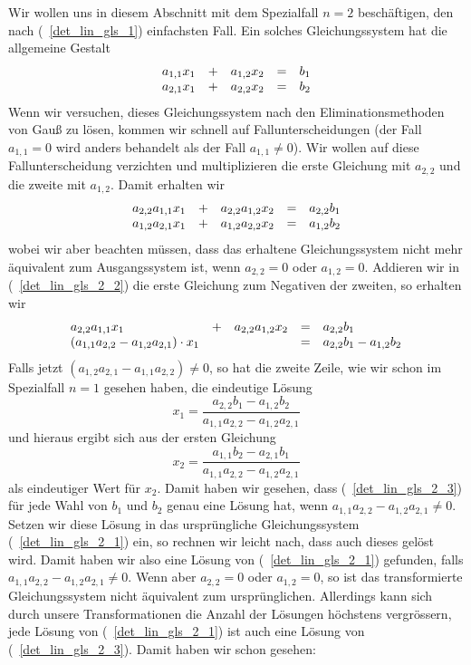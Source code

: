 Wir wollen uns in diesem Abschnitt mit dem Spezialfall $n = 2$ beschäftigen, den 
nach (~\ref{det_lin_gls_1}) einfachsten Fall. Ein solches Gleichungssystem hat die allgemeine Gestalt
  	\begin{equation}\label{det_lin_gls_2_1} \begin{array} {l c l c l c l}
  	a_{1,1} x_1 & + & a_{1,2} x_2 & = & b_1 \\
  	a_{2,1} x_1 & + & a_{2,2} x_2 & = & b_2
  	\end{array} \end{equation}
Wenn wir versuchen, dieses Gleichungssystem nach den Eliminations\-me\-tho\-den von Gauß zu lösen, kommen 
wir schnell auf Fallunterscheidungen (der Fall $a_{1,1} = 0$ wird anders behandelt als der Fall $a_{1,1} \neq 0$). 
Wir wollen auf diese Fallunterscheidung verzichten und multiplizieren die erste Gleichung mit $a_{2,2}$ und 
die zweite mit $a_{1,2}$. Damit erhalten wir 
  	\begin{equation}\label{det_lin_gls_2_2} \begin{array} {l c l c l c l}
  	a_{2,2} a_{1,1} x_1 & + & a_{2,2} a_{1,2} x_2 & = & a_{2,2} b_1 \\
  	a_{1,2} a_{2,1} x_1 & + & a_{1,2} a_{2,2} x_2 & = & a_{1,2} b_2
  	\end{array} \end{equation}
wobei wir aber beachten müssen, dass das erhaltene Gleichungssystem nicht mehr äquivalent zum Ausgangssystem 
ist, wenn $a_{2,2} = 0$ oder $a_{1,2} = 0$. Addieren wir in (~\ref{det_lin_gls_2_2}) die erste Gleichung zum  
Negativen der zweiten, so erhalten wir 
  	\begin{equation}\label{det_lin_gls_2_3} \begin{array} {l c l c l c l}
  	a_{2,2} a_{1,1} x_1 & + & a_{2,2} a_{1,2} x_2 & = & a_{2,2} b_1 \\
  	\left(a_{1,1} a_{2,2} - a_{1,2} a_{2,1} \right) \cdot x_1 &  &  & = & a_{2,2} b_1 - a_{1,2} b_2
  	\end{array} \end{equation}
Falls jetzt $\left(a_{1,2} a_{2,1} - a_{1,1} a_{2,2} \right) \neq 0$, so hat die zweite Zeile, wie wir 
schon im Spezialfall $n = 1$ gesehen haben, die eindeutige Lösung
  	$$ x_1 = \frac {a_{2,2} b_1 - a_{1,2} b_2}{a_{1,1} a_{2,2} - a_{1,2} a_{2,1}} $$
und hieraus ergibt sich aus der ersten Gleichung
  	$$ x_2 = \frac {a_{1,1} b_2 - a_{2,1} b_1}{a_{1,1} a_{2,2} - a_{1,2} a_{2,1}} $$
als eindeutiger Wert für $x_2$. Damit haben wir gesehen, dass (~\ref{det_lin_gls_2_3}) für jede Wahl von 
$b_1$ und $b_2$ genau eine Lösung hat, wenn $a_{1,1} a_{2,2} - a_{1,2} a_{2,1} \neq 0$. Setzen wir diese 
Lösung in das ursprüngliche Gleichungssystem (~\ref{det_lin_gls_2_1}) ein, so rechnen wir leicht nach, dass
auch dieses gelöst wird. Damit haben wir also eine Lösung von (~\ref{det_lin_gls_2_1}) gefunden, falls 
$a_{1,1} a_{2,2} - a_{1,2} a_{2,1} \neq 0$. Wenn aber $a_{2,2} = 0$ oder $a_{1,2} = 0$, so ist das transformierte 
Gleichungssystem nicht äquivalent zum ursprünglichen. Allerdings kann sich durch unsere Transformationen 
die Anzahl der Lösungen höchstens vergrö{ss}ern, jede Lösung von (~\ref{det_lin_gls_2_1}) ist auch eine 
Lösung von (~\ref{det_lin_gls_2_3}). Damit haben wir schon gesehen:

